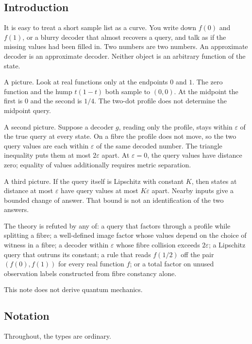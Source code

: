 \documentclass[
  11pt,
]{article}
\begin{document}
\subsection{Introduction}\label{introduction}

It is easy to treat a short sample list as a curve. You write down \(f(0)\) and \(f(1)\), or a blurry decoder that almost recovers a query, and talk as if the missing values had been filled in. Two numbers are two numbers. An approximate decoder is an approximate decoder. Neither object is an arbitrary function of the state.

A picture. Look at real functions only at the endpoints \(0\) and \(1\). The zero function and the hump \(t(1-t)\) both sample to \((0,0)\). At the midpoint the first is \(0\) and the second is \(1/4\). The two-dot profile does not determine the midpoint query.

A second picture. Suppose a decoder \(g\), reading only the profile, stays within \(\varepsilon\) of the true query at every state. On a fibre the profile does not move, so the two query values are each within \(\varepsilon\) of the same decoded number. The triangle inequality puts them at most \(2\varepsilon\) apart. At \(\varepsilon=0\), the query values have distance zero; equality of values additionally requires metric separation.

A third picture. If the query itself is Lipschitz with constant \(K\), then states at distance at most \(\varepsilon\) have query values at most \(K\varepsilon\) apart. Nearby inputs give a bounded change of answer. That bound is not an identification of the two answers.

The theory is refuted by any of: a query that factors through a profile while splitting a fibre; a well-defined image factor whose values depend on the choice of witness in a fibre; a decoder within \(\varepsilon\) whose fibre collision exceeds \(2\varepsilon\); a Lipschitz query that outruns its constant; a rule that reads \(f(1/2)\) off the pair \((f(0),f(1))\) for every real function \(f\); or a total factor on unused observation labels constructed from fibre constancy alone.

This note does not derive quantum mechanics.

\subsection{Notation}\label{notation}

Throughout, the types are ordinary.
\end{document}
